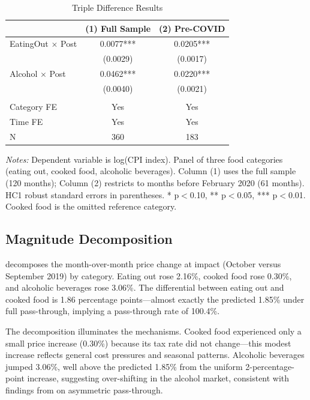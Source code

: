 \documentclass[12pt]{article}
\begin{document}
\begin{table}[H]
\centering
\caption{Triple Difference Results}
\begin{threeparttable}
\begin{tabular}{lcc}
\toprule
 & (1) Full Sample & (2) Pre-COVID \\
\midrule
EatingOut $\times$ Post & 0.0077*** & 0.0205*** \\
 & (0.0029) & (0.0017) \\
Alcohol $\times$ Post & 0.0462*** & 0.0220*** \\
 & (0.0040) & (0.0021) \\
\\
Category FE & Yes & Yes \\
Time FE & Yes & Yes \\
N & 360 & 183 \\
\bottomrule
\end{tabular}
\begin{tablenotes}[flushleft]
\small
\item \textit{Notes:} Dependent variable is log(CPI index). Panel of three food categories (eating out, cooked food, alcoholic beverages). Column (1) uses the full sample (120 months); Column (2) restricts to months before February 2020 (61 months). HC1 robust standard errors in parentheses. * p$<$0.10, ** p$<$0.05, *** p$<$0.01. Cooked food is the omitted reference category.
\end{tablenotes}
\end{threeparttable}
\label{tab:ddd}
\end{table}

\subsection{Magnitude Decomposition}

 decomposes the month-over-month price change at impact (October versus September 2019) by category. Eating out rose 2.16\%, cooked food rose 0.30\%, and alcoholic beverages rose 3.06\%. The differential between eating out and cooked food is 1.86 percentage points---almost exactly the predicted 1.85\% under full pass-through, implying a pass-through rate of 100.4\%.

The decomposition illuminates the mechanisms. Cooked food experienced only a small price increase (0.30\%) because its tax rate did not change---this modest increase reflects general cost pressures and seasonal patterns. Alcoholic beverages jumped 3.06\%, well above the predicted 1.85\% from the uniform 2-percentage-point increase, suggesting over-shifting in the alcohol market, consistent with findings from \citet{benzarti2020passthrough} on asymmetric pass-through.
\end{document}
